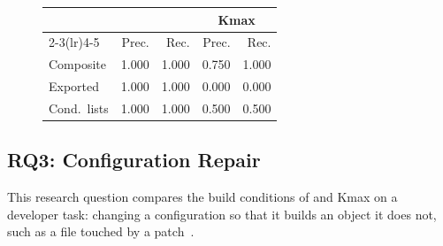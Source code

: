 \documentclass[acmsmall,screen,review,anonymous,nonacm]{acmart}
\begin{document}
\begin{figure}[t]
\begin{minipage}[c]{0.66\linewidth}
\label{fig:rq2}
\end{minipage}
\hfill
\begin{minipage}[c]{0.31\linewidth}
\centering\scriptsize
{}
\label{tab:rq2}
\addtocounter{figure}{-1}
\setlength{\tabcolsep}{2.5pt}
\begin{tabular}{lrrrr}
\toprule
& \multicolumn{2}{c}{\tool{}} & \multicolumn{2}{c}{Kmax} \\
\cmidrule(lr){2-3}\cmidrule(lr){4-5}
& Prec. & Rec. & Prec. & Rec. \\
\midrule
Composite & 1.000 & 1.000 & 0.750 & 1.000 \\
Exported & 1.000 & 1.000 & 0.000 & 0.000 \\
Cond.\ lists & 1.000 & 1.000 & 0.500 & 0.500 \\
\bottomrule
\end{tabular}
\end{minipage}
\end{figure}

\subsection{RQ3: Configuration Repair}\label{sec:rq3}
This research question compares the build conditions of \tool{} and Kmax on a developer task: changing a configuration so that it builds an object it does not, such as a file touched by a patch~\cite{yildiran2024krepair}.
\end{document}
